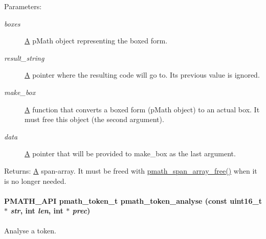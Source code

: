 \begin{Desc}
\item[Parameters:]
\begin{description}
\item[{\em boxes}]\hyperlink{class_a}{A} pMath object representing the boxed form. \item[{\em result\_\-string}]\hyperlink{class_a}{A} pointer where the resulting code will go to. Its previous value is ignored. \item[{\em make\_\-box}]\hyperlink{class_a}{A} function that converts a boxed form (pMath object) to an actual box. It must free this object (the second argument). \item[{\em data}]\hyperlink{class_a}{A} pointer that will be provided to make\_\-box as the last argument. \end{description}
\end{Desc}
\begin{Desc}
\item[Returns:]\hyperlink{class_a}{A} span-array. It must be freed with \hyperlink{group__parser_gceb05ef4c39c239d68f39e3b9bde5f1e}{pmath\_\-span\_\-array\_\-free()} when it is no longer needed. \end{Desc}
\hypertarget{group__parser_g0cfde53ccdddc80d034dc5ee1ea54508}{
\paragraph[{pmath\_\-token\_\-analyse}]{\setlength{\rightskip}{0pt plus 5cm}PMATH\_\-API {\bf pmath\_\-token\_\-t} pmath\_\-token\_\-analyse (const uint16\_\-t $\ast$ {\em str}, \/  int {\em len}, \/  int $\ast$ {\em prec})}\hfill}
\label{group__parser_g0cfde53ccdddc80d034dc5ee1ea54508}


Analyse a token. 

